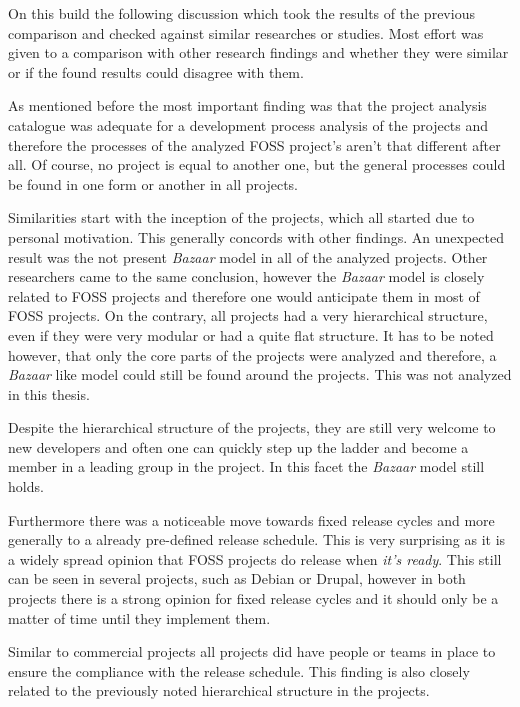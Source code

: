 On this build the following discussion which took the results of the previous
comparison and checked against similar researches or studies. Most effort was
given to a comparison with other research findings and whether they were
similar or if the found results could disagree with them.

As mentioned before the most important finding was that the project analysis
catalogue was adequate for a development process analysis of the projects and
therefore the processes of the analyzed \ac{FOSS} project's aren't that
different after all. Of course, no project is equal to another one, but the
general processes could be found in one form or another in all projects.

Similarities start with the inception of the projects, which all started due to
personal motivation. This generally concords with other findings. An unexpected
result was the not present \emph{Bazaar} model in all of the analyzed projects.
Other researchers came to the same conclusion, however the \emph{Bazaar} model
is closely related to \ac{FOSS} projects and therefore one would anticipate
them in most of \ac{FOSS} projects. On the contrary, all projects had a very
hierarchical structure, even if they were very modular or had a quite flat
structure. It has to be noted however, that only the core parts of the projects
were analyzed and therefore, a \emph{Bazaar} like model could still be found
around the projects. This was not analyzed in this thesis.

Despite the hierarchical structure of the projects, they are still very welcome
to new developers and often one can quickly step up the ladder and become a
member in a leading group in the project. In this facet the \emph{Bazaar} model
still holds.

Furthermore there was a noticeable move towards fixed release cycles and more
generally to a already pre-defined release schedule. This is very surprising as
it is a widely spread opinion that \ac{FOSS} projects do release when
\emph{it's ready}. This still can be seen in several projects, such as Debian
or Drupal, however in both projects there is a strong opinion for fixed release
cycles and it should only be a matter of time until they implement them.

Similar to commercial projects all projects did have people or teams in place
to ensure the compliance with the release schedule. This finding is also
closely related to the previously noted hierarchical structure in the projects.

